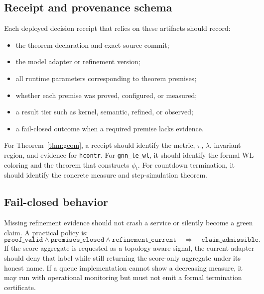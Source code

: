 \documentclass[10pt,letterpaper]{article}
\theoremstyle{definition}
\begin{document}
\subsection{Receipt and provenance schema}
Each deployed decision receipt that relies on these artifacts should record:
\begin{itemize}
\item the theorem declaration and exact source commit;
\item the model adapter or refinement version;
\item all runtime parameters corresponding to theorem premises;
\item whether each premise was proved, configured, or measured;
\item a result tier such as kernel, semantic, refined, or observed;
\item a fail-closed outcome when a required premise lacks evidence.
\end{itemize}
For Theorem~\ref{thm:geom}, a receipt should identify the metric, \(\pi\),
\(\lambda\), invariant region, and evidence for \texttt{hcontr}. For
\texttt{gnn\_le\_wl}, it should identify the formal WL coloring and the theorem
that constructs \(\phi_t\). For countdown termination, it should identify the
concrete measure and step-simulation theorem.

\subsection{Fail-closed behavior}
Missing refinement evidence should not crash a service or silently become a
green claim. A practical policy is:
\[
\texttt{proof\_valid}
\land \texttt{premises\_closed}
\land \texttt{refinement\_current}
\quad\Longrightarrow\quad
\texttt{claim\_admissible}.
\]
If the score aggregate is requested as a topology-aware signal, the current
adapter should deny that label while still returning the score-only aggregate
under its honest name. If a queue implementation cannot show a decreasing
measure, it may run with operational monitoring but must not emit a formal
termination certificate.
\end{document}
